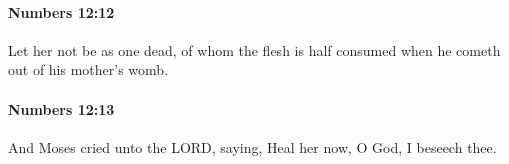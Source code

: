		\paragraph{Numbers 12:12} %
			\label{NUMBERS-12-12}

			Let her not be as one dead, of whom the flesh is half consumed when he cometh out of his mother’s womb.


		\paragraph{Numbers 12:13} %
			\label{NUMBERS-12-13}

			And Moses cried unto the LORD, saying, Heal her now, O God, I beseech thee.


